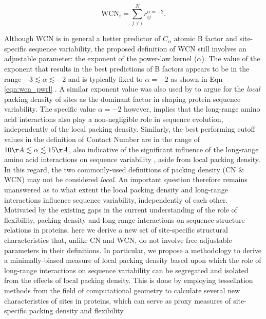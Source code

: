 \documentclass[11pt]{article}
\begin{document}
    \begin{equation}
        \label{eqn:wcn_pwrl}
        \text{WCN}_{i} = \sum^N_{j\neq i} {r_{ij}^{\alpha=-2}}.
    \end{equation}

    Although WCN is in general a better predictor of $C_\alpha$ atomic B factor and site-specific sequence variability, the proposed definition of WCN still involves an adjustable parameter: the exponent of the power-law kernel ($\alpha$). The value of the exponent that results in the best predictions of B factors appears to be in the range $-3\lesssim\alpha\lesssim-2$ and is typically fixed to $\alpha=-2$ as shown in Eqn \ref{eqn:wcn_pwrl} \citep[e.g.,][]{yang_protein_2009}.  A similar exponent value was also used by \citet{huang_mechanistic_2014} to argue for the {\it local} packing density of sites as the dominant factor in shaping protein sequence variability. The specific value $\alpha=-2$ however, implies that the long-range amino acid interactions also play a non-negligible role in sequence evolution, independently of the local packing density. Similarly, the best performing cutoff values in the definition of Contact Number are in the range of $10\AA\lesssim\alpha\lesssim15\AA$, also indicative of the significant influence of the long-range amino acid interactions on sequence variability \citep[e.g.,][]{franzosa_structural_2009, shahmoradi_predicting_2014}, aside from local packing density. In this regard, the two commonly-used definitions of packing density (CN \& WCN) may not be considered {\it local}. An important question therefore remains unanswered as to what extent the local packing density and long-range interactions influence sequence variability, independently of each other. \\

    Motivated by the existing gaps in the current understanding of the role of flexibility, packing density and long-range interactions on sequence-structure relations in proteins, here we derive a new set of site-specific structural characteristics that, unlike CN and WCN, do not involve free adjustable parameters in their definitions. In particular, we propose a methodology to derive a minimally-biased measure of local packing density based upon which the role of long-range interactions on sequence variability can be segregated and isolated from the effects of local packing density.  This is done by employing tessellation methods from the field of computational geometry to calculate several new characteristics of sites in proteins, which can serve as proxy measures of site-specific packing density and flexibility.
\end{document}
